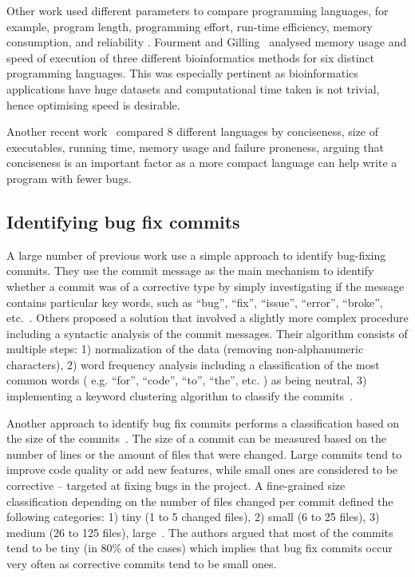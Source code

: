 \documentclass{sig-alternate}
\begin{document}
Other work used different parameters to compare programming languages, for example, program length, programming effort, run-time efficiency, memory consumption, and reliability \cite{Prechelt2000}.  Fourment and Gilling~\cite{Fourment2008} analysed memory usage and speed of execution of three different bioinformatics methods for six distinct programming languages. This was especially pertinent as bioinformatics applications have huge datasets and computational time taken is not trivial, hence optimising speed is desirable.

Another recent work~\cite{Nanz2015} compared 8 different languages by conciseness, size of executables, running time, memory usage and failure proneness, arguing that conciseness is an important factor as a more compact language can help write a program with fewer bugs.

\subsection{Identifying bug fix commits}

A large number of previous work use a simple approach to identify bug-fixing commits. They use the commit message as the main mechanism to identify whether a commit was of a corrective type by simply investigating if the message contains particular key words, such as ``bug'', ``fix'', ``issue'', ``error'', ``broke'', etc.~\cite{Hattori2008, Ratzinger2008, Hindle2008}.  Others proposed a solution that involved a slightly more complex procedure including a syntactic analysis of the commit messages. Their algorithm consists of multiple steps: 1) normalization of the data (removing non-alphanumeric characters), 2) word frequency analysis including a classification of the most common words ( e.g. ``for'', ``code'', ``to'', ``the'', etc. ) as being neutral, 3) implementing a keyword clustering algorithm to classify the commits~\cite{Mockus2000}.

Another approach to identify bug fix commits performs a classification based on the size of the commits~\cite{Hattori2008,Mockus2000,Hindle2008}. The size of a commit can be measured based on the number of lines or the amount of files that were changed. Large commits tend to improve code quality or add new features, while small ones are considered to be corrective -- targeted at fixing bugs in the project. A fine-grained size classification depending on the number of files changed per commit defined the following categories: 1) tiny (1 to 5 changed files), 2) small (6 to 25 files), 3) medium (26 to 125 files), large~\cite{Hattori2008}. The authors argued that most of the commits tend to be tiny (in 80\% of the cases) which implies that bug fix commits occur very often as corrective commits tend to be small ones.
\end{document}
